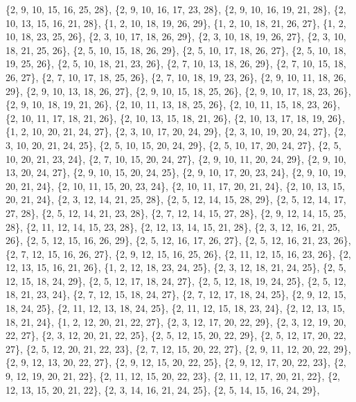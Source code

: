 \documentclass[11pt,a4paper]{article}
\begin{document}
{\{2, 9, 10, 15, 16, 25, 28\}, \{2, 9, 10, 16, 17, 23, 28\}, \{2, 9, 10, 16, 19, 21, 28\}, \{2, 10, 13, 15, 16, 21, 28\}, \{1, 2, 10, 18, 19, 26, 29\},
\{1, 2, 10, 18, 21, 26, 27\}, \{1, 2, 10, 18, 23, 25, 26\}, \{2, 3, 10, 17, 18, 26, 29\}, \{2, 3, 10, 18, 19, 26, 27\}, \{2, 3, 10, 18, 21, 25, 26\},
\{2, 5, 10, 15, 18, 26, 29\}, \{2, 5, 10, 17, 18, 26, 27\}, \{2, 5, 10, 18, 19, 25, 26\}, \{2, 5, 10, 18, 21, 23, 26\}, \{2, 7, 10, 13, 18, 26, 29\},
\{2, 7, 10, 15, 18, 26, 27\}, \{2, 7, 10, 17, 18, 25, 26\}, \{2, 7, 10, 18, 19, 23, 26\}, \{2, 9, 10, 11, 18, 26, 29\}, \{2, 9, 10, 13, 18, 26, 27\},
\{2, 9, 10, 15, 18, 25, 26\}, \{2, 9, 10, 17, 18, 23, 26\}, \{2, 9, 10, 18, 19, 21, 26\}, \{2, 10, 11, 13, 18, 25, 26\}, \{2, 10, 11, 15, 18, 23, 26\},
\{2, 10, 11, 17, 18, 21, 26\}, \{2, 10, 13, 15, 18, 21, 26\}, \{2, 10, 13, 17, 18, 19, 26\}, \{1, 2, 10, 20, 21, 24, 27\}, \{2, 3, 10, 17, 20, 24, 29\},
\{2, 3, 10, 19, 20, 24, 27\}, \{2, 3, 10, 20, 21, 24, 25\}, \{2, 5, 10, 15, 20, 24, 29\}, \{2, 5, 10, 17, 20, 24, 27\}, \{2, 5, 10, 20, 21, 23, 24\},
\{2, 7, 10, 15, 20, 24, 27\}, \{2, 9, 10, 11, 20, 24, 29\}, \{2, 9, 10, 13, 20, 24, 27\}, \{2, 9, 10, 15, 20, 24, 25\}, \{2, 9, 10, 17, 20, 23, 24\},
\{2, 9, 10, 19, 20, 21, 24\}, \{2, 10, 11, 15, 20, 23, 24\}, \{2, 10, 11, 17, 20, 21, 24\}, \{2, 10, 13, 15, 20, 21, 24\}, \{2, 3, 12, 14, 21, 25, 28\},
\{2, 5, 12, 14, 15, 28, 29\}, \{2, 5, 12, 14, 17, 27, 28\}, \{2, 5, 12, 14, 21, 23, 28\}, \{2, 7, 12, 14, 15, 27, 28\}, \{2, 9, 12, 14, 15, 25, 28\},
\{2, 11, 12, 14, 15, 23, 28\}, \{2, 12, 13, 14, 15, 21, 28\}, \{2, 3, 12, 16, 21, 25, 26\}, \{2, 5, 12, 15, 16, 26, 29\}, \{2, 5, 12, 16, 17, 26, 27\},
\{2, 5, 12, 16, 21, 23, 26\}, \{2, 7, 12, 15, 16, 26, 27\}, \{2, 9, 12, 15, 16, 25, 26\}, \{2, 11, 12, 15, 16, 23, 26\}, \{2, 12, 13, 15, 16, 21, 26\},
\{1, 2, 12, 18, 23, 24, 25\}, \{2, 3, 12, 18, 21, 24, 25\}, \{2, 5, 12, 15, 18, 24, 29\}, \{2, 5, 12, 17, 18, 24, 27\}, \{2, 5, 12, 18, 19, 24, 25\},
\{2, 5, 12, 18, 21, 23, 24\}, \{2, 7, 12, 15, 18, 24, 27\}, \{2, 7, 12, 17, 18, 24, 25\}, \{2, 9, 12, 15, 18, 24, 25\}, \{2, 11, 12, 13, 18, 24, 25\},
\{2, 11, 12, 15, 18, 23, 24\}, \{2, 12, 13, 15, 18, 21, 24\}, \{1, 2, 12, 20, 21, 22, 27\}, \{2, 3, 12, 17, 20, 22, 29\}, \{2, 3, 12, 19, 20, 22, 27\},
\{2, 3, 12, 20, 21, 22, 25\}, \{2, 5, 12, 15, 20, 22, 29\}, \{2, 5, 12, 17, 20, 22, 27\}, \{2, 5, 12, 20, 21, 22, 23\}, \{2, 7, 12, 15, 20, 22, 27\},
\{2, 9, 11, 12, 20, 22, 29\}, \{2, 9, 12, 13, 20, 22, 27\}, \{2, 9, 12, 15, 20, 22, 25\}, \{2, 9, 12, 17, 20, 22, 23\}, \{2, 9, 12, 19, 20, 21, 22\},
\{2, 11, 12, 15, 20, 22, 23\}, \{2, 11, 12, 17, 20, 21, 22\}, \{2, 12, 13, 15, 20, 21, 22\}, \{2, 3, 14, 16, 21, 24, 25\}, \{2, 5, 14, 15, 16, 24, 29\},
}
\end{document}
